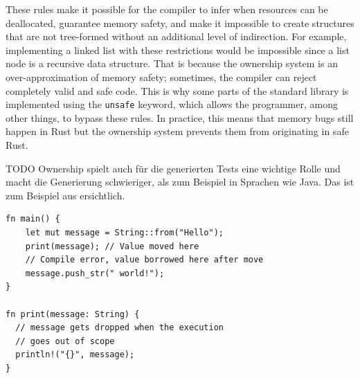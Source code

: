 \documentclass[paper=a4,%
  twoside,%
  BCOR4mm,%
  abstract=true,%
  toc=bibliography,%
  chapterprefix=true,%
  toc=bibliographynumbered,%
  open=right,%
  english,%
  pagesize=pdftex]{scrreprt}
\begin{document}
These rules make it possible for the compiler to infer when resources can be deallocated, guarantee memory safety, and make it impossible to create structures that are not tree-formed without an additional level of indirection. For example, implementing a linked list with these restrictions would be impossible since a list node is a recursive data structure. That is because the ownership system is an over-approximation of memory safety; sometimes, the compiler can reject completely valid and safe code. This is why some parts of the standard library is implemented using the \texttt{unsafe} keyword, which allows the programmer, among other things, to bypass these rules. In practice, this means that memory bugs still happen in Rust but the ownership system prevents them from originating in safe Rust.

TODO Ownership spielt auch für die generierten Tests eine wichtige Rolle und macht die Generierung schwieriger, als zum Beispiel in Sprachen wie Java. Das ist zum Beispiel aus  ersichtlich.
\begin{lstlisting}[style=boxed, caption={Transferring the ownership to a method}, label=lst:ownership-method-call]
fn main() {
    let mut message = String::from("Hello");
    print(message); // Value moved here
    // Compile error, value borrowed here after move
    message.push_str(" world!");
}

fn print(message: String) {
  // message gets dropped when the execution
  // goes out of scope
  println!("{}", message);
}
\end{lstlisting}

\end{document}
